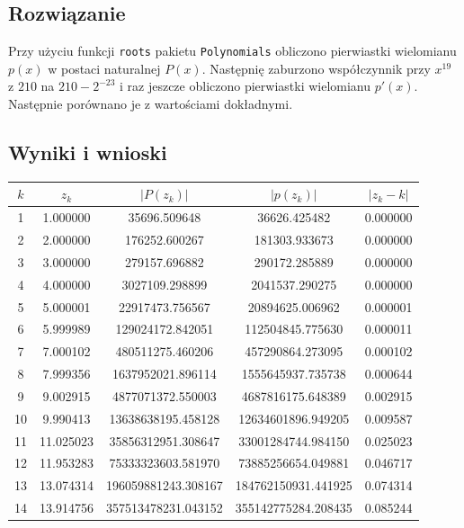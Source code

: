 \documentclass{article}
\begin{document}
\subsection{Rozwiązanie}
Przy użyciu funkcji \texttt{roots} pakietu \texttt{Polynomials} obliczono pierwiastki wielomianu $p(x)$ w postaci naturalnej $P(x)$. Następnię zaburzono współczynnik przy $x^{19}$ z $210$ na $210 - 2^{-23}$ i raz jeszcze obliczono pierwiastki wielomianu $p'(x)$. Następnie porównano je z wartościami dokładnymi.

\subsection{Wyniki i wnioski}
\begin{table}[h!]
    \centering
    \begin{tabular}{ |c|c|c|c|c| }
    \hline
    $k$ & $z_k$ & $|P(z_k)|$ & $|p(z_k)|$ & $|z_k - k|$ \\ 
    \hline
    1 & 1.000000 & 35696.509648 & 36626.425482 & 0.000000 \\ 
    \hline
    2 & 2.000000 & 176252.600267 & 181303.933673 & 0.000000 \\ 
    \hline
    3 & 3.000000 & 279157.696882 & 290172.285889 & 0.000000 \\ 
    \hline
    4 & 4.000000 & 3027109.298899 & 2041537.290275 & 0.000000 \\ 
    \hline
    5 & 5.000001 & 22917473.756567 & 20894625.006962 & 0.000001 \\ 
    \hline
    6 & 5.999989 & 129024172.842051 & 112504845.775630 & 0.000011 \\ 
    \hline
    7 & 7.000102 & 480511275.460206 & 457290864.273095 & 0.000102 \\ 
    \hline
    8 & 7.999356 & 1637952021.896114 & 1555645937.735738 & 0.000644 \\ 
    \hline
    9 & 9.002915 & 4877071372.550003 & 4687816175.648389 & 0.002915 \\ 
    \hline
    10 & 9.990413 & 13638638195.458128 & 12634601896.949205 & 0.009587 \\ 
    \hline
    11 & 11.025023 & 35856312951.308647 & 33001284744.984150 & 0.025023 \\ 
    \hline
    12 & 11.953283 & 75333323603.581970 & 73885256654.049881 & 0.046717 \\ 
    \hline
    13 & 13.074314 & 196059881243.308167 & 184762150931.441925 & 0.074314 \\ 
    \hline
    14 & 13.914756 & 357513478231.043152 & 355142775284.208435 & 0.085244 \\ 

\end{tabular}
\end{table}
\end{document}
